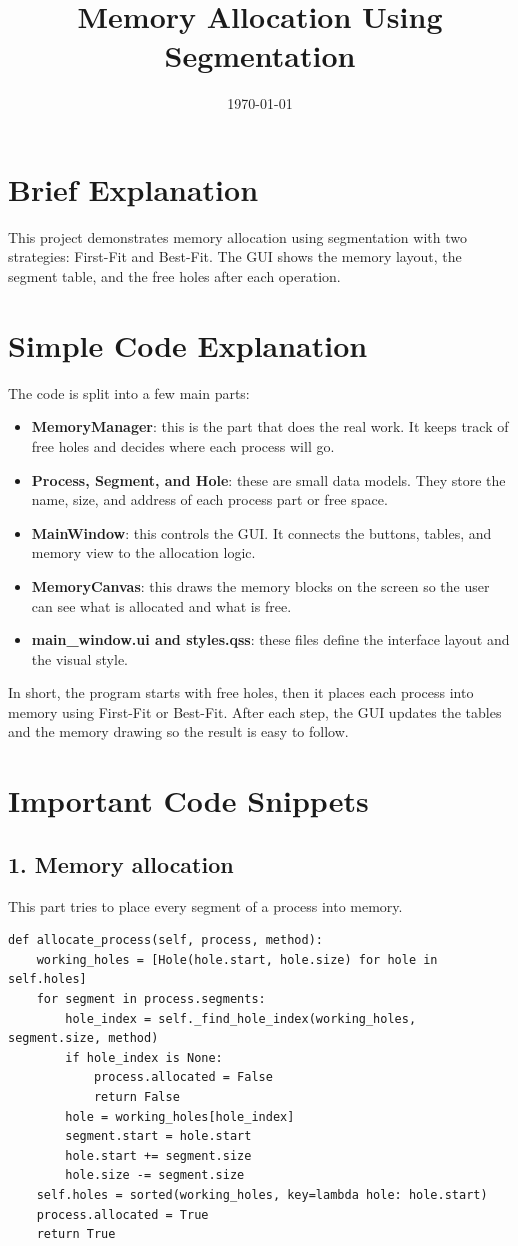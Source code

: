 \documentclass[12pt,a4paper]{report}
\title{\textbf{Memory Allocation Using Segmentation}}
\author{}
\date{\today}
\begin{document}
\maketitle

\section*{Brief Explanation}
This project demonstrates memory allocation using segmentation with two strategies: First-Fit and Best-Fit. The GUI shows the memory layout, the segment table, and the free holes after each operation.

\section*{Simple Code Explanation}
The code is split into a few main parts:
\begin{itemize}
    \item \textbf{MemoryManager}: this is the part that does the real work. It keeps track of free holes and decides where each process will go.
    \item \textbf{Process, Segment, and Hole}: these are small data models. They store the name, size, and address of each process part or free space.
    \item \textbf{MainWindow}: this controls the GUI. It connects the buttons, tables, and memory view to the allocation logic.
    \item \textbf{MemoryCanvas}: this draws the memory blocks on the screen so the user can see what is allocated and what is free.
    \item \textbf{main\_window.ui and styles.qss}: these files define the interface layout and the visual style.
\end{itemize}

In short, the program starts with free holes, then it places each process into memory using First-Fit or Best-Fit. After each step, the GUI updates the tables and the memory drawing so the result is easy to follow.

\section*{Important Code Snippets}
\subsection*{1. Memory allocation}
This part tries to place every segment of a process into memory.
\begin{verbatim}
def allocate_process(self, process, method):
    working_holes = [Hole(hole.start, hole.size) for hole in self.holes]
    for segment in process.segments:
        hole_index = self._find_hole_index(working_holes, segment.size, method)
        if hole_index is None:
            process.allocated = False
            return False
        hole = working_holes[hole_index]
        segment.start = hole.start
        hole.start += segment.size
        hole.size -= segment.size
    self.holes = sorted(working_holes, key=lambda hole: hole.start)
    process.allocated = True
    return True
\end{verbatim}
\end{document}
